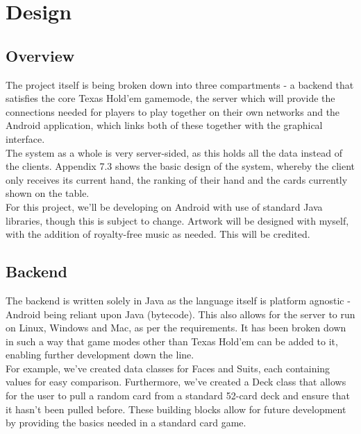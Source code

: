 \documentclass[11pt]{article}
\begin{document}
\newpage
\section{Design}

\subsection{Overview}

The project itself is being broken down into three compartments - a backend that satisfies the core Texas Hold'em gamemode, the server which will provide the connections needed for players to play together on their own networks and the Android application, which links both of these together with the graphical interface. \\

The system as a whole is very server-sided, as this holds all the data instead of the clients. Appendix 7.3 shows the basic design of the system, whereby the client only receives its current hand, the ranking of their hand and the cards currently shown on the table. \\

For this project, we'll be developing on Android with use of standard Java libraries, though this is subject to change. Artwork will be designed with myself, with the addition of royalty-free music as needed. This will be credited. 

\subsection{Backend}

The backend is written solely in Java as the language itself is platform agnostic - Android being reliant upon Java (bytecode). This also allows for the server to run on Linux, Windows and Mac, as per the requirements. It has been broken down in such a way that game modes other than Texas Hold'em can be added to it, enabling further development down the line. \\

For example, we've created data classes for Faces and Suits, each containing values for easy comparison. Furthermore, we've created a Deck class that allows for the user to pull a random card from a standard 52-card deck and ensure that it hasn't been pulled before. These building blocks allow for future development by providing the basics needed in a standard card game.


\newpage
\end{document}
